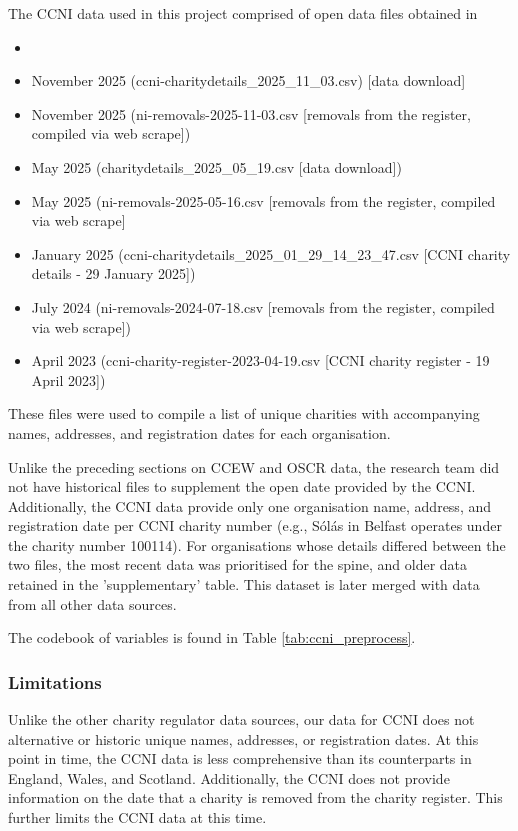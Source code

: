 \documentclass{article}
\begin{document}
The CCNI data used in this project comprised of open data files obtained in 
\begin{itemize}
  \item 
  \item November 2025 (ccni-charitydetails\_2025\_11\_03.csv) [data download]
  \item November 2025 (ni-removals-2025-11-03.csv 	[removals from the register, compiled via web scrape])
  \item May 2025  (charitydetails\_2025\_05\_19.csv		[data download])
  \item May 2025 (ni-removals-2025-05-16.csv [removals from the register, compiled via web scrape]
  \item January 2025 (ccni-charitydetails\_2025\_01\_29\_14\_23\_47.csv [CCNI charity details - 29 January 2025])
  \item July 2024 (ni-removals-2024-07-18.csv	[removals from the register, compiled via web scrape])
  \item April 2023 (ccni-charity-register-2023-04-19.csv [CCNI charity register - 19 April 2023])
  
\end{itemize}
These files were used to compile a list of unique charities with accompanying names, addresses, and
registration dates for each organisation. 

Unlike the preceding sections on CCEW and OSCR data, the research team did not have
historical files to supplement the open date provided by the CCNI. Additionally, the CCNI data
provide only one organisation name, address, and registration date per CCNI charity number
(e.g., S\'{o}l\'{a}s in Belfast operates under the charity number 100114). For organisations whose details differed
between the two files, the most recent data was prioritised for the spine, and older data retained in the 
'supplementary' table. This dataset is later merged with data from all other data sources.

The codebook of variables is found in Table \ref{tab:ccni_preprocess}.

\subsubsection{Limitations}
Unlike the other charity regulator data sources, our data for CCNI does not alternative or historic
unique names, addresses, or registration dates. 
At this point in time, the CCNI data is less comprehensive than its counterparts in England, Wales,
and Scotland. Additionally, the CCNI does not provide information on the date that a charity is
removed from the charity register. This further limits the CCNI data at this time.
\end{document}
